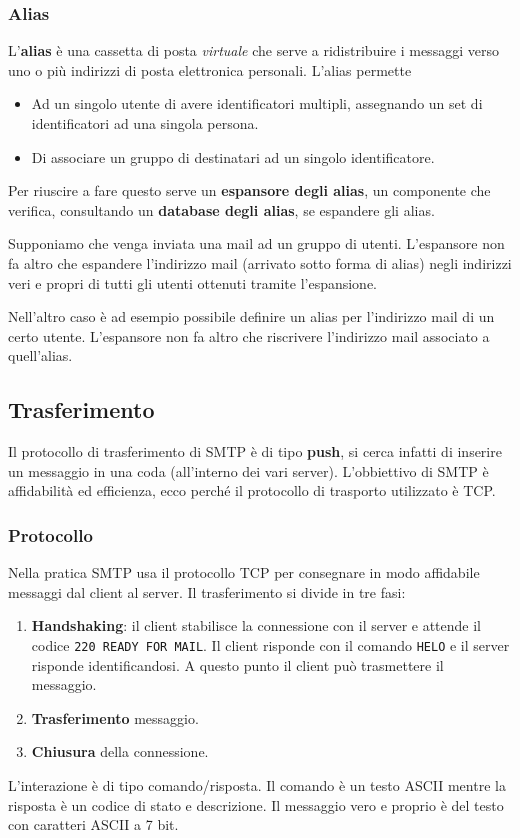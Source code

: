 \subsubsection{Alias}
L'\textbf{alias} è una cassetta di posta \emph{virtuale} che serve a 
ridistribuire i messaggi verso uno o più indirizzi di posta elettronica
personali. L'alias permette
\begin{itemize}
	\item Ad un singolo utente di avere identificatori multipli, 
		assegnando un set di identificatori ad una singola persona.
	\item Di associare un gruppo di destinatari ad un singolo 
		identificatore.
\end{itemize}
Per riuscire a fare questo serve un \textbf{espansore degli alias},
un componente che verifica, consultando un \textbf{database degli 
alias}, se espandere gli alias.

Supponiamo che venga inviata una mail ad un gruppo di utenti. 
L'espansore non fa altro che espandere l'indirizzo mail (arrivato sotto
forma di alias) negli indirizzi veri e propri di tutti gli utenti
ottenuti tramite l'espansione.

Nell'altro caso è ad esempio possibile definire un alias per 
l'indirizzo mail di un certo utente. L'espansore non fa altro che
riscrivere l'indirizzo mail associato a quell'alias.

\subsection{Trasferimento}
Il protocollo di trasferimento di SMTP è di tipo \textbf{push}, si 
cerca infatti di inserire un messaggio in una coda (all'interno dei 
vari server). L'obbiettivo di SMTP è affidabilità ed efficienza, ecco 
perché il protocollo di trasporto utilizzato è TCP.

\subsubsection{Protocollo}
Nella pratica SMTP usa il protocollo TCP per consegnare in modo 
affidabile messaggi dal client al server. Il trasferimento si divide in
tre fasi:
\begin{enumerate}
	\item \textbf{Handshaking}: il client stabilisce la connessione 
		con il server e attende il codice \verb|220 READY FOR MAIL|. Il
		client risponde con il comando \verb|HELO| e il server risponde
		identificandosi. A questo punto il client può trasmettere il 
		messaggio.
	\item \textbf{Trasferimento} messaggio.
	\item \textbf{Chiusura} della connessione.
\end{enumerate}
L'interazione è di tipo comando/risposta. Il comando è un testo ASCII 
mentre la risposta è un codice di stato e descrizione. Il messaggio
vero e proprio è del testo con caratteri ASCII a 7 bit.

